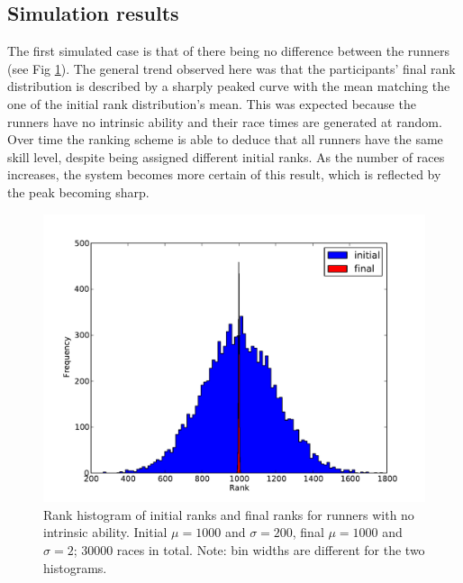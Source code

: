 \subsection{Simulation results}
The first simulated case is that of there being no difference between the runners (see Fig \ref{fig:sameAbilitiesRanks}). The general trend observed here was that the participants' final rank distribution is described by a sharply peaked curve with the mean matching the one of the initial rank distribution's mean. This was expected because the runners have no intrinsic ability and their race times are generated at random. Over time the ranking scheme is able to deduce that all runners have the same skill level, despite being assigned different initial ranks. As the number of races increases, the system becomes more certain of this result, which is reflected by the peak becoming sharp.
\begin{figure}[h]     
\begin{center}
\includegraphics[width=15cm]{./images/sameAbilitiesRanks.pdf}
\end{center}
\caption{Rank histogram of initial ranks and final ranks for runners with no intrinsic ability. Initial $\mu=1000$ and $\sigma=200$, final $\mu=1000$ and $\sigma=2$; 30000 races in total. Note: bin widths are different for the two histograms.}
\label{fig:sameAbilitiesRanks}
\end{figure}\\
